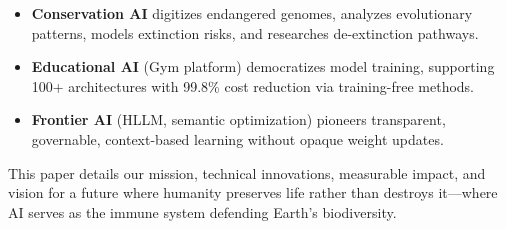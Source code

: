 \begin{itemize}
    \item \textbf{Conservation AI} digitizes endangered genomes, analyzes evolutionary patterns, models extinction risks, and researches de-extinction pathways.
    \item \textbf{Educational AI} (Gym platform) democratizes model training, supporting 100+ architectures with 99.8\% cost reduction via training-free methods.
    \item \textbf{Frontier AI} (HLLM, semantic optimization) pioneers transparent, governable, context-based learning without opaque weight updates.
\end{itemize}

This paper details our mission, technical innovations, measurable impact, and vision for a future where humanity preserves life rather than destroys it—where AI serves as the immune system defending Earth's biodiversity.

